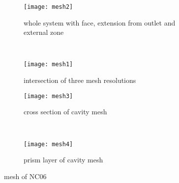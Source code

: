 \begin{figure}
  \begin{subfigure}[t]{0.5\textwidth}
    \texttt{[image: mesh2]}
    \caption{whole system with face, extension from outlet and external zone}
    \label{fig:mesh1}
  \end{subfigure}%
  ~%
  \begin{subfigure}[t]{0.5\textwidth}
    \texttt{[image: mesh1]}
    \caption{intersection of three mesh resolutions}
    \label{fig:mesh2}
  \end{subfigure}

  \begin{subfigure}[t]{0.5\textwidth}
    \texttt{[image: mesh3]}
    \caption{cross section of cavity mesh}
    \label{fig:mesh3}
  \end{subfigure}%
  ~%
  \begin{subfigure}[t]{0.5\textwidth}
    \texttt{[image: mesh4]}
    \caption{prism layer of cavity mesh}
    \label{fig:mesh4}
  \end{subfigure}
  \caption{mesh of NC06} \label{fig:cavme}
\end{figure}
